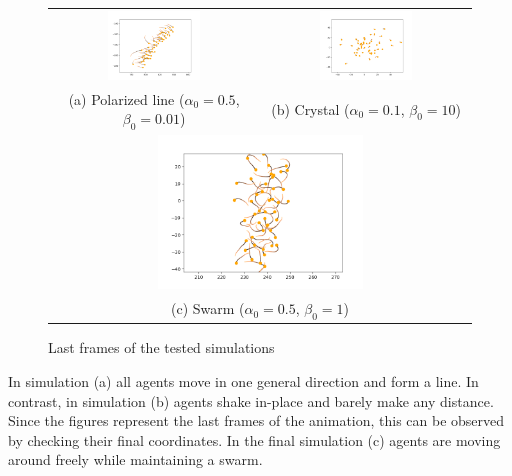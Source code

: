 \documentclass[9pt]{pnas-new}
\begin{document}
\begin{figure}[H]
    \centering
    \begin{tabular}{cc}
        \includegraphics[width=0.466\textwidth]{line.png} &
        \includegraphics[width=0.466\textwidth]{crystal.png} \\
        (a) Polarized line ($\alpha_0 = 0.5$, $\beta_0 = 0.01$) & (b) Crystal ($\alpha_0 = 0.1$, $\beta_0 = 10$) \\
        \multicolumn{2}{c}{
            \includegraphics[width=0.5\textwidth]{swarm.png}
        } \\
        \multicolumn{2}{c}{(c) Swarm ($\alpha_0 = 0.5$, $\beta_0 = 1$)}
    \end{tabular}
    \caption{Last frames of the tested simulations}
    \label{fig:simulation}
\end{figure}

In simulation (a) all agents move in one general direction and form a line.
In contrast, in simulation (b) agents shake in-place and barely make any distance.
Since the figures represent the last frames of the animation, this can be observed by checking their final coordinates.
In the final simulation (c) agents are moving around freely while maintaining a swarm.
\end{document}
